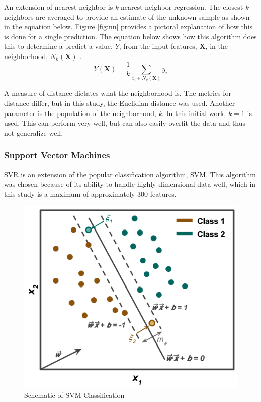 An extension of nearest neighbor is \textit{k}-nearest neighbor regression.
The closest \textit{k} neighbors are averaged to provide an estimate of the
unknown sample as shown in the equation below.  Figure \ref{fig:nn} provides a
pictoral explanation of how this is done for a single prediction.  The equation
below shows how this algorithm does this to determine a predict a value, $Y$,
from the input features, $\boldsymbol{X}$, in the neighborhood, $N_k
(\boldsymbol{X})$ \cite{elements_stats}. 
\begin{equation}
  Y(\boldsymbol{X}) = \frac{1}{k} \sum_{x_i \in N_k(\boldsymbol{X})} y_i
\end{equation}

A measure of distance dictates what the neighborhood is. The metrics for
distance differ, but in this study, the Euclidian distance was used. Another
parameter is the population of the neighborhood, \textit{k}. In this initial
work, $k = 1$ is used. This can perform very well, but can also easily overfit
the data and thus not generalize well. 

\subsubsection{Support Vector Machines}
\label{sec:svm}

\Acrfull{SVR} is an extension of the popular classification algorithm, \acrfull{SVM}.
This algorithm was chosen because of its ability to handle highly dimensional
data well, which in this study is a maximum of approximately 300 features. 

\begin{figure}[!htb]
  \centering
  \includegraphics[width=0.8\linewidth]{./chapters/litrev/svm.png}
  \caption{Schematic of \gls{SVM} Classification}
  \label{fig:svm}
\end{figure}

